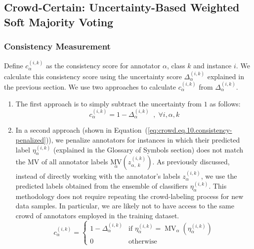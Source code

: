 \subsection{Crowd-Certain: Uncertainty-Based Weighted Soft Majority Voting}
\subsubsection{Consistency Measurement}
Define $c_{\alpha}^{(i,k)} $ as the consistency score for annotator $\alpha $, class $k $ and instance $i $. We calculate this consistency score using the uncertainty score $\Delta_{\alpha}^{(i,k)} $ explained in the previous section. We use two approaches to calculate $c_{\alpha}^{(i,k)} $ from $\Delta_{\alpha}^{(i,k)} $.
\begin{enumerate}
    \item The first approach is to simply subtract the uncertainty from $1 $ as follows:
    \begin{equation}
        c_{\alpha}^{(i,k)}=1-\Delta_{\alpha}^{(i,k)}\;\;,\;\forall i,\alpha,k
        \label{eq:crowd.Eq.9.consistency}
    \end{equation}
    \item In a second approach (shown in Equation~(\ref{eq:crowd.eq.10.consistency-penalized})), we penalize annotators for instances in which their predicted label $\eta_{\alpha}^{(i,k)} $ (explained in the Glossary of Symbols section) does not match the MV of all annotator labels ${{\underset \alpha{\mathrm{MV}}}{\left(z_{\alpha,\;k}^{(i,k)}\right)}} $. As previously discussed, instead of directly working with the annotator's labels $z_{\alpha}^{(i,k)} $, we use the predicted labels obtained from the ensemble of classifiers $\eta_{\alpha}^{(i,k)} $. This methodology does not require repeating the crowd-labeling process for new data samples. In particular, we are likely not to have access to the same crowd of annotators employed in the training dataset.
    \begin{equation}
        c_{\alpha}^{(i,k)} =
        \begin{cases}
            1 - \Delta_{\alpha}^{(i,k)} & \text{if } \eta_{\alpha}^{(i,k)} = \operatorname{MV}_{\alpha}(\eta_{\alpha}^{(i,k)}) \\
            0 & \text{otherwise}
        \end{cases}
        \label{eq:crowd.eq.10.consistency-penalized}
    \end{equation}
\end{enumerate}
